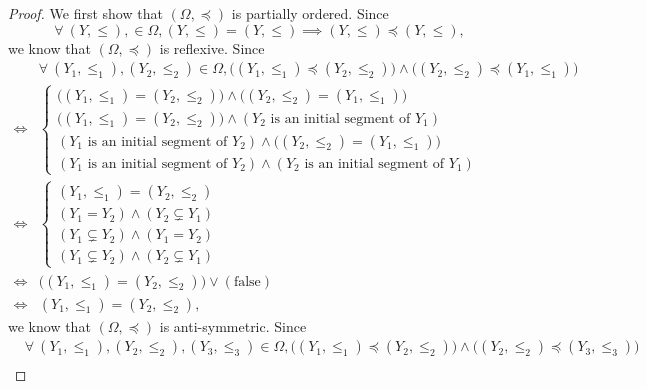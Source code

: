 \begin{proof}
    We first show that \((\Omega, \preceq)\) is partially ordered.
    Since
    \[
        \forall\ (Y, \leq), \in \Omega, (Y, \leq) = (Y, \leq) \implies (Y, \leq) \preceq (Y, \leq),
    \]
    we know that \((\Omega, \preceq)\) is reflexive.
    Since
    \begin{align*}
             & \forall\ (Y_1, \leq_1), (Y_2, \leq_2) \in \Omega, \big((Y_1, \leq_1) \preceq (Y_2, \leq_2)\big) \land \big((Y_2, \leq_2) \preceq (Y_1, \leq_1)\big) \\
        \iff & \begin{cases}
            \big((Y_1, \leq_1) = (Y_2, \leq_2)\big) \land \big((Y_2, \leq_2) = (Y_1, \leq_1)\big)     \\
            \big((Y_1, \leq_1) = (Y_2, \leq_2)\big) \land (Y_2 \text{ is an initial segment of } Y_1) \\
            (Y_1 \text{ is an initial segment of } Y_2) \land \big((Y_2, \leq_2) = (Y_1, \leq_1)\big) \\
            (Y_1 \text{ is an initial segment of } Y_2) \land (Y_2 \text{ is an initial segment of } Y_1)
        \end{cases}                                                                                                                          \\
        \iff & \begin{cases}
            (Y_1, \leq_1) = (Y_2, \leq_2)          \\
            (Y_1 = Y_2) \land (Y_2 \subsetneq Y_1) \\
            (Y_1 \subsetneq Y_2) \land (Y_1 = Y_2) \\
            (Y_1 \subsetneq Y_2) \land (Y_2 \subsetneq Y_1)
        \end{cases}                                                                                                                          \\
        \iff & \big((Y_1, \leq_1) = (Y_2, \leq_2)\big) \lor (\text{false})                                                                                         \\
        \iff & (Y_1, \leq_1) = (Y_2, \leq_2),
    \end{align*}
    we know that \((\Omega, \preceq)\) is anti-symmetric.
    Since
    \begin{align*}
             & \forall\ (Y_1, \leq_1), (Y_2, \leq_2), (Y_3, \leq_3) \in \Omega, \big((Y_1, \leq_1) \preceq (Y_2, \leq_2)\big) \land \big((Y_2, \leq_2) \preceq (Y_3, \leq_3)\big) \\

\end{align*}
\end{proof}
